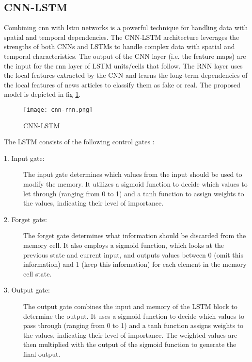 \subsection{CNN-LSTM}

Combining \ac{cnn} with \ac{lstm} networks is a powerful technique for handling data with spatial and temporal dependencies. The CNN-LSTM architecture leverages the strengths of both CNNs and LSTMs to handle complex data with spatial and temporal characteristics. The output of the CNN layer (i.e. the feature maps) are the input for the \ac{rnn} layer of LSTM units/cells that follow. The RNN layer uses the local features extracted by the CNN and learns the long-term dependencies of the local features of news articles to classify them as fake or real. The proposed model is depicted in fig \ref{fig:cnn-lstm}. \\

\begin{figure}[h]
    \centering
    \texttt{[image: cnn-rnn.png]}
    \caption{CNN-LSTM}
    \label{fig:cnn-lstm}
\end{figure}

The LSTM consists of the following control gates :

\begin{description}

    \item[1. Input gate:] The input gate determines which values from the input should be used to modify the memory. It utilizes a sigmoid function to decide which values to let through (ranging from 0 to 1) and a tanh function to assign weights to the values, indicating their level of importance.

    \item[2. Forget gate:] The forget gate determines what information should be discarded from the memory cell. It also employs a sigmoid function, which looks at the previous state and current input, and outputs values between 0 (omit this information) and 1 (keep this information) for each element in the memory cell state.
   
    \item[3. Output gate:] The output gate combines the input and memory of the LSTM block to determine the output. It uses a sigmoid function to decide which values to pass through (ranging from 0 to 1) and a tanh function assigns weights to the values, indicating their level of importance. The weighted values are then multiplied with the output of the sigmoid function to generate the final output.
       
\end{description}

